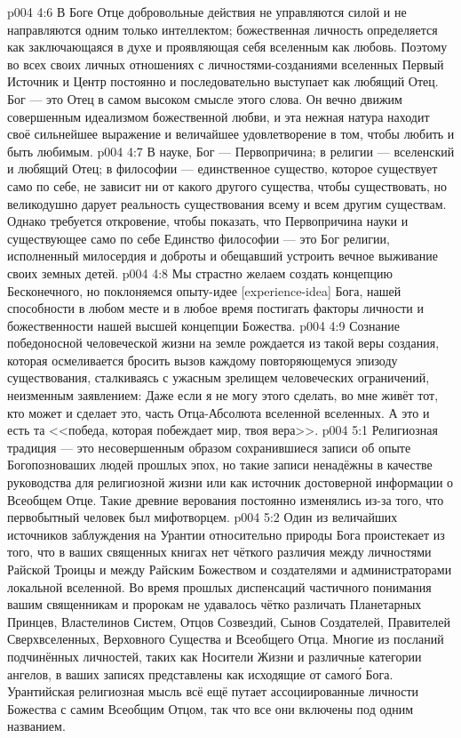 \vs p004 4:6 В Боге Отце добровольные действия не управляются силой и не направляются одним только интеллектом; божественная личность определяется как заключающаяся в духе и проявляющая себя вселенным как любовь. Поэтому во всех своих личных отношениях с личностями\hyp{}созданиями вселенных Первый Источник и Центр постоянно и последовательно выступает как любящий Отец. Бог --- это Отец в самом высоком смысле этого слова. Он вечно движим совершенным идеализмом божественной любви, и эта нежная натура находит своё сильнейшее выражение и величайшее удовлетворение в том, чтобы любить и быть любимым.
\vs p004 4:7 \pc В науке, Бог --- Первопричина; в религии --- вселенский и любящий Отец; в философии --- единственное существо, которое существует само по себе, не зависит ни от какого другого существа, чтобы существовать, но великодушно дарует реальность существования всему и всем другим существам. Однако требуется откровение, чтобы показать, что Первопричина науки и существующее само по себе Единство философии --- это Бог религии, исполненный милосердия и доброты и обещавший устроить вечное выживание своих земных детей.
\vs p004 4:8 Мы страстно желаем создать концепцию Бесконечного, но поклоняемся опыту\hyp{}идее [experience\hyp{}idea] Бога, нашей способности в любом месте и в любое время постигать факторы личности и божественности нашей высшей концепции Божества.
\vs p004 4:9 Сознание победоносной человеческой жизни на земле рождается из такой веры создания, которая осмеливается бросить вызов каждому повторяющемуся эпизоду существования, сталкиваясь с ужасным зрелищем человеческих ограничений, неизменным заявлением: Даже если я не могу этого сделать, во мне живёт тот, кто может и сделает это, часть Отца\hyp{}Абсолюта вселенной вселенных. А это и есть та <<победа, которая побеждает мир, твоя вера>>.
\vs p004 5:1 Религиозная традиция --- это несовершенным образом сохранившиеся записи об опыте Богопозноваших людей прошлых эпох, но такие записи ненадёжны в качестве руководства для религиозной жизни или как источник достоверной информации о Всеобщем Отце. Такие древние верования постоянно изменялись из\hyp{}за того, что первобытный человек был мифотворцем.
\vs p004 5:2 Один из величайших источников заблуждения на Урантии относительно природы Бога проистекает из того, что в ваших священных книгах нет чёткого различия между личностями Райской Троицы и между Райским Божеством и создателями и администраторами локальной вселенной. Во время прошлых диспенсаций частичного понимания вашим священникам и пророкам не удавалось чётко различать Планетарных Принцев, Властелинов Систем, Отцов Созвездий, Сынов Создателей, Правителей Сверхвселенных, Верховного Существа и Всеобщего Отца. Многие из посланий подчинённых личностей, таких как Носители Жизни и различные категории ангелов, в ваших записях представлены как исходящие от самог\'о Бога. Урантийская религиозная мысль всё ещё путает ассоциированные личности Божества с самим Всеобщим Отцом, так что все они включены под одним названием.
